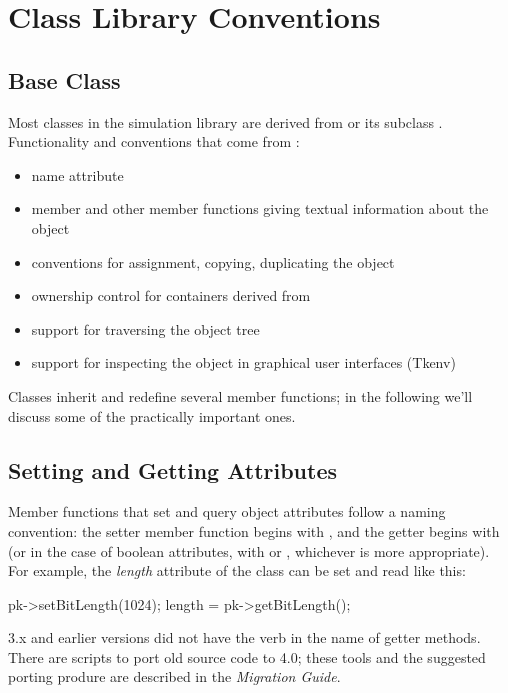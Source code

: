 \section{Class Library Conventions}

\subsection{Base Class}
\label{sec:ch-sim-lib:cobject}


Most classes in the {\opp} simulation library are derived from 
or its subclass . Functionality and conventions that
come from :
\begin{itemize}
  \item{name attribute}
  \item{ member and other member functions giving textual
    information about the object}
  \item{conventions for assignment, copying, duplicating the object}
  \item{ownership control for containers derived from }
  \item{support for traversing the object tree}
  \item{support for inspecting the object in graphical user interfaces (Tkenv)}
\end{itemize}

Classes inherit and redefine several  member functions;
in the following we'll discuss some of the practically important
ones.


\subsection{Setting and Getting Attributes}

Member functions that set and query object attributes follow
a naming convention: the setter member function begins with
, and the getter begins with  (or in the case of
boolean attributes, with  or , whichever is more
appropriate). For example, the \textit{length} attribute of the
 class can be set and read like this:

\begin{cpp}
pk->setBitLength(1024);
length = pk->getBitLength();
\end{cpp}

\begin{note}
    {\opp} 3.x and earlier versions did not have the  verb
    in the name of getter methods. There are scripts to port old source
    code to {\opp} 4.0; these tools and the suggested porting produre
    are described in the \textit{Migration Guide}.
\end{note}

